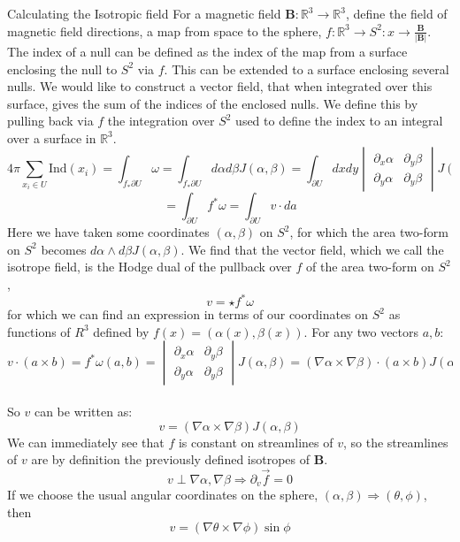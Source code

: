 \documentclass[final]{beamer}
\newlength{\onecolwid}
\begin{document}
\begin{frame}[t]
\begin{columns}[t]
\begin{column}{\onecolwid}
\begin{block}{Calculating the Isotropic field}
For a magnetic field $\mathbf{B}:\mathbb{R}^3\rightarrow\mathbb{R}^3$, define the field of magnetic field directions, a map from space to the sphere, $f:\mathbb{R}^3\rightarrow S^2:x\rightarrow\frac{\mathbf{B}}{|\mathbf{B}|}$. The index of a null can be defined as the index of the map from a surface enclosing the null to $S^2$ via $f$. This can be extended to a surface enclosing several nulls. We would like to construct a vector field, that when integrated over this surface, gives the sum of the indices of the enclosed nulls. We define this by pulling back via $f$ the integration over $S^2$ used to define the index to an integral over a surface in $\mathbb{R}^3$.\\
$$4\pi\sum_{x_i\in U}\mathrm{Ind}(x_i)=\int_{f_*\partial U}\omega=\int_{f_*\partial U}d\alpha d\beta J(\alpha,\beta)=\int_{\partial U}dxdy
\begin{vmatrix}
  \partial_x\alpha & \partial_y \beta \\
  \partial_y\alpha & \partial_y \beta
\end{vmatrix}
J(\alpha,\beta)$$
$$=\int_{\partial U}f^*\omega=\int_{\partial U}v\cdot da$$
Here we have taken some coordinates $(\alpha,\beta)$ on $S^2$, for which the area two-form on $S^2$ becomes $d\alpha\wedge d\beta J(\alpha,\beta)$. We find that the vector field, which we call the isotrope field, is the Hodge dual of the pullback over $f$ of the area two-form on $S^2$,
$$v=\star f^*\omega$$
for which we can find an expression in terms of our coordinates on $S^2$ as functions of $R^3$ defined by $f(x)=(\alpha(x),\beta(x))$. For any two vectors $a,b$:
$$v\cdot(a\times b)=f^*\omega(a,b)=
\begin{vmatrix}
  \partial_x\alpha & \partial_y \beta \\
  \partial_y\alpha & \partial_y \beta
\end{vmatrix}
J(\alpha,\beta)=(\nabla\alpha\times\nabla\beta)\cdot(a\times b)J(\alpha,\beta)$$\\
So $v$ can be written as:
$$v=(\nabla\alpha\times\nabla\beta)J(\alpha,\beta)$$
We can immediately see that $f$ is constant on streamlines of $v$, so the streamlines of $v$ are by definition the previously defined isotropes of $\mathbf{B}$.
$$v\perp\nabla\alpha,\nabla\beta\Rightarrow\partial_v\vec f=0$$
If we choose the usual angular coordinates on the sphere, $(\alpha,\beta)\Rightarrow(\theta,\phi)$, then
$$v=(\nabla\theta\times\nabla\phi)\sin\phi$$


\end{block}


\end{column}
\end{columns}
\end{frame}
\end{document}
